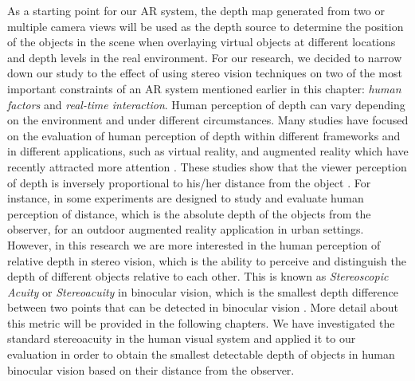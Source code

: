 As a starting point for our AR system, the depth map generated from two or multiple camera views
will be used as the depth source to determine the position of the objects in the scene when
overlaying virtual objects at different locations and depth levels in the real environment. 
For our research, we decided to narrow down our study to the effect of using stereo vision techniques
on two of the most important constraints of an AR system mentioned earlier in this chapter: 
{\it human factors} and {\it real-time interaction}. {\newline}
Human perception of depth can vary depending on the environment and under different circumstances. Many studies have focused on the evaluation of human perception of depth within different frameworks
and in different applications, such as virtual reality, and augmented reality which have recently 
attracted more attention \cite{wann95,dras96,liv05,jer05,swa07,kru10}.
These studies show that the viewer perception of depth
is inversely proportional to his/her distance from the object \cite{kru10,swa07,jer05,liv05}. For instance, in \cite{swa07} some experiments are designed to study and evaluate human
perception of distance, which is the absolute depth of the objects from the observer, for an outdoor augmented reality application in urban settings. 
However, in this research we are more interested in the human perception of relative depth in stereo vision, which is the ability to perceive and distinguish 
the depth of different objects relative to each other. This is known as {\it Stereoscopic Acuity} or {\it Stereoacuity} 
in binocular vision, which is the smallest depth difference between two points 
that can be detected in binocular vision \cite{pfa2000}. More detail about
this metric will be provided in the following chapters.
We have investigated the standard stereoacuity in the human visual system and applied it to our evaluation in order to obtain the smallest detectable depth of 
objects in human binocular vision based on their distance from the observer.


